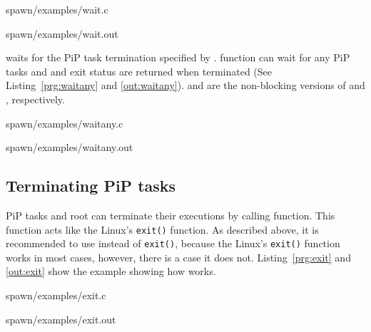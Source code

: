 
                {spawn/examples/wait.c}

 {spawn/examples/wait.out}

 waits for the PiP task termination specified by
        {\PIPID}. 
 function can wait for any PiP tasks and
        {\PIPID} and exit status are returned when terminated (See
        Listing~\ref{prg:waitany} and \ref{out:waitany}).
         and  are
        the non-blocking versions of  and
        , respectively. 


                {spawn/examples/waitany.c}

 {spawn/examples/waitany.out}


\subsection{Terminating PiP tasks}

PiP tasks and root can terminate their executions by calling
 function. This function acts like the Linux's
        {\tt exit()} function. As described above, it is recommended
        to use  
        instead of {\tt exit()}, because the Linux's {\tt exit()}
        function works in most cases, however, there is a case it does
        not. Listing~\ref{prg:exit} and \ref{out:exit} show the
        example showing how  works.

 {spawn/examples/exit.c}

 {spawn/examples/exit.out}

